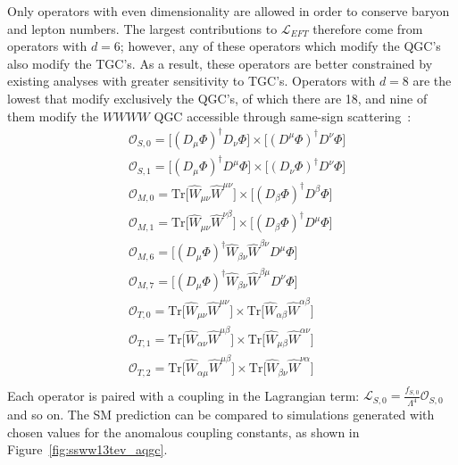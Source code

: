 Only operators with even dimensionality are allowed in order to conserve baryon and lepton numbers.
The largest contributions to $\mathcal{L}_{EFT}$ therefore come from operators with $d=6$; however, any of these operators which modify the QGC's also modify the TGC's.
As a result, these operators are better constrained by existing analyses with greater sensitivity to TGC's.
Operators with $d=8$ are the lowest that modify exclusively the QGC's, of which there are 18, and nine of them modify the $WWWW$ QGC accessible through same-sign \sswwnojj scattering~\cite{2006.aqgc-at-lhc, 2013.aqgc-mc}:
\begin{equation}
  \begin{aligned}
    &\mathcal{O}_{S,0} = \big[(D_\mu\Phi)^\dagger D_\nu\Phi\big]\times\big[(D^\mu\Phi)^\dagger D^\nu\Phi\big]\\
    &\mathcal{O}_{S,1} = \big[(D_\mu\Phi)^\dagger D^\mu\Phi\big]\times\big[(D_\nu\Phi)^\dagger D^\nu\Phi\big]\\
    &\mathcal{O}_{M,0} = \textrm{Tr}\big[\hat{W}_{\mu\nu}\hat{W}^{\mu\nu}\big]\times\big[(D_\beta\Phi)^\dagger D^\beta\Phi\big]\\
    &\mathcal{O}_{M,1} = \textrm{Tr}\big[\hat{W}_{\mu\nu}\hat{W}^{\nu\beta}\big]\times\big[(D_\beta\Phi)^\dagger D^\mu\Phi\big]\\
    &\mathcal{O}_{M,6} = \big[(D_\mu\Phi)^\dagger\hat{W}_{\beta\nu}\hat{W}^{\beta\nu}D^\mu\Phi\big]\\
    &\mathcal{O}_{M,7} = \big[(D_\mu\Phi)^\dagger\hat{W}_{\beta\nu}\hat{W}^{\beta\mu}D^\nu\Phi\big]\\
    &\mathcal{O}_{T,0} = \textrm{Tr}\big[\hat{W}_{\mu\nu}\hat{W}^{\mu\nu}\big]\times\textrm{Tr}\big[\hat{W}_{\alpha\beta}\hat{W}^{\alpha\beta}\big]\\
    &\mathcal{O}_{T,1} = \textrm{Tr}\big[\hat{W}_{\alpha\nu}\hat{W}^{\mu\beta}\big]\times\textrm{Tr}\big[\hat{W}_{\mu\beta}\hat{W}^{\alpha\nu}\big]\\
    &\mathcal{O}_{T,2} = \textrm{Tr}\big[\hat{W}_{\alpha\mu}\hat{W}^{\mu\beta}\big]\times\textrm{Tr}\big[\hat{W}_{\beta\nu}\hat{W}^{\nu\alpha}\big]\\
  \end{aligned}
  \label{eq:aqgc_dim8}
\end{equation}
Each operator is paired with a coupling in the Lagrangian term: $\mathcal{L}_{S,0} = \frac{f_{S,0}}{\Lambda^4}\mathcal{O}_{S,0}$ and so on.
The SM prediction can be compared to simulations generated with chosen values for the anomalous coupling constants, as shown in Figure~\ref{fig:ssww13tev_aqgc}.

